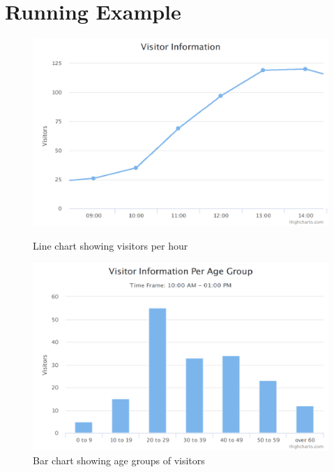 \vspace*{-0.6cm}
\section{Running Example}


\begin{figure}[t]
  \centering
  \includegraphics[width=0.8\columnwidth]{figures/first-line.png}
  \caption{Line chart showing visitors per hour}
\label{figure:first-running-example:first-line-chart}
   \vspace*{0.1cm}
  \includegraphics[width=0.8\columnwidth]{figures/first-bar.png}
  \caption{Bar chart showing age groups of visitors}
  \vspace{-10pt}
  \label{figure:first-running-example:first-bar-chart}
  
\end{figure}

